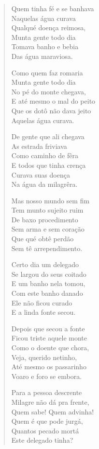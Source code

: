 \begin{verse}
Quem tinha fé e se banhava\\
Naquelas água curava\\
Qualqué doença reimosa,\\
Munta gente todo dia\\
Tomava banho e bebia\\
Das água maraviosa.

Como quem faz romaria\\
Munta gente todo dia\\
No pé do monte chegava,\\
E até mesmo o mal do peito\\
Que os dotô não dava jeito\\
Aquelas água curava.

De gente que ali chegava\\
As estrada friviava\\
Como caminho de fêra\\
E todos que tinha crença\\
Curava suas doença\\
Na água da milagrêra.

Mas nosso mundo sem fim\\
Tem munto sujeito ruim\\
De baxo procedimento\\
Sem arma e sem coração\\
Que qué obtê perdão\\
Sem tê arrependimento.

Certo dia um delegado\\
Se largou do seus coitado\\
E um banho nela tomou,\\
Com este banho danado\\
Ele não ficou curado\\
E a linda fonte secou.

Depois que secou a fonte\\
Ficou triste aquele monte\\
Como o doente que chora,\\
Veja, querido netinho,\\
Até mesmo os passarinho\\
Voaro e foro se embora.

Para a pessoa descrente\\
Milagre não dá pra frente,\\
Quem sabe! Quem advinha!\\
Quem é que pode jurgá,\\
Quantos pecado mortá\\
Este delegado tinha?
\end{verse}

